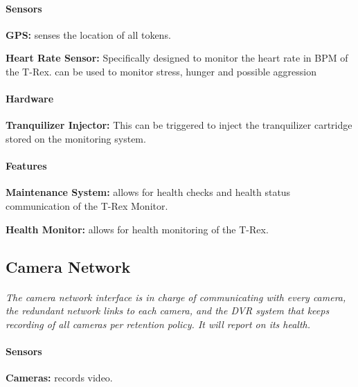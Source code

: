 \documentclass[12pt]{article}
\begin{document}
	\paragraph{Sensors}
	\begin{list}{}{}
		\item \textbf{GPS: } senses the location of all tokens.
		\item \textbf{Heart Rate Sensor: } Specifically designed to monitor the heart 
		rate in BPM of the T-Rex. can be used to monitor stress, hunger and possible 
		aggression
	\end{list}
		
	\paragraph{Hardware}
	\begin{list}{}{}
		\item \textbf{Tranquilizer Injector: } This can be triggered to inject the 
		tranquilizer cartridge stored on the monitoring system.
	\end{list}

	\paragraph{Features}
	\begin{list}{}{}
		\item \textbf{Maintenance System: }allows for health checks and health status 
		communication of the T-Rex Monitor.  
		\item \textbf{Health Monitor: }allows for health monitoring of the T-Rex.
	\end{list}

	\subsection{Camera Network}
	\paragraph{} \textit{The camera network interface is in charge of communicating with 
	every camera, the redundant network links to each camera, and the DVR system that keeps 
	recording of all cameras per retention policy. It will report on its health.}		
	
	\paragraph{Sensors}
	\begin{list}{}{}
		\item \textbf{Cameras: }records video. 
	\end{list}
		
\end{document}

